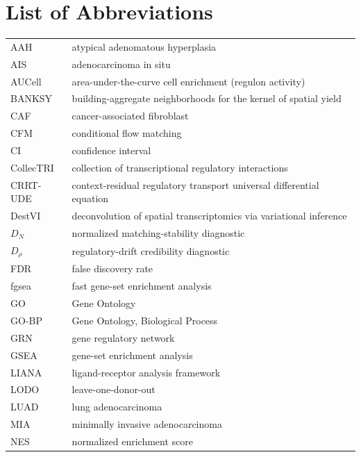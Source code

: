 \clearpage
{}
{}
\chapter*{List of Abbreviations}

\begin{singlespace}
\begin{longtable}{@{}p{}p{}@{}}
AAH & atypical adenomatous hyperplasia \\
AIS & adenocarcinoma in situ \\
AUCell & area-under-the-curve cell enrichment (regulon activity) \\
BANKSY & building-aggregate neighborhoods for the kernel of spatial yield \\
CAF & cancer-associated fibroblast \\
CFM & conditional flow matching \\
CI & confidence interval \\
CollecTRI & collection of transcriptional regulatory interactions \\
CRRT-UDE & context-residual regulatory transport universal differential equation \\
DestVI & deconvolution of spatial transcriptomics via variational inference \\
$D_N$ & normalized matching-stability diagnostic \\
$D_\rho$ & regulatory-drift credibility diagnostic \\
FDR & false discovery rate \\
fgsea & fast gene-set enrichment analysis \\
GO & Gene Ontology \\
GO-BP & Gene Ontology, Biological Process \\
GRN & gene regulatory network \\
GSEA & gene-set enrichment analysis \\
LIANA & ligand-receptor analysis framework \\
LODO & leave-one-donor-out \\
LUAD & lung adenocarcinoma \\
MIA & minimally invasive adenocarcinoma \\
NES & normalized enrichment score \\

\end{longtable}
\end{singlespace}
